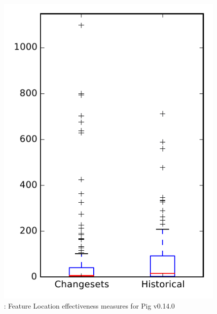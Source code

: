 
\begin{figure}
\centering
\includegraphics[height=0.4\textheight]{figures/flt/rq2_pig}
\caption{\ftwo: Feature Location effectiveness measures for Pig v0.14.0}
\label{fig:flt:rq2:pig}
\end{figure}

